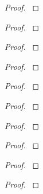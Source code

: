 \documentclass[12pt,reqno]{amsart}
\begin{document}
\begin{exe}\label{11.9}

\begin{proof}\label{s11.9}

\end{proof} 
\end{exe} 

\begin{exe}\label{11.10}

\begin{proof}\label{s11.10}

\end{proof} 
\end{exe} 

\begin{exe}\label{11.11}

\begin{proof}\label{s11.11}

\end{proof} 
\end{exe} 

\begin{exe}\label{11.12}

\begin{proof}\label{s11.12}

\end{proof} 
\end{exe} 

\begin{exe}\label{11.13}

\begin{proof}\label{s11.13}

\end{proof} 
\end{exe} 

\begin{exe}\label{11.14}

\begin{proof}\label{s11.14}

\end{proof} 
\end{exe} 

\begin{exe}\label{11.15}

\begin{proof}\label{s11.15}

\end{proof} 
\end{exe} 

\begin{exe}\label{11.16}

\begin{proof}\label{s11.16}

\end{proof} 
\end{exe} 

\begin{exe}\label{11.17}

\begin{proof}\label{s11.17}

\end{proof} 
\end{exe} 

\begin{exe}\label{11.18}

\begin{proof}\label{s11.18}

\end{proof} 
\end{exe} 
\end{document}

